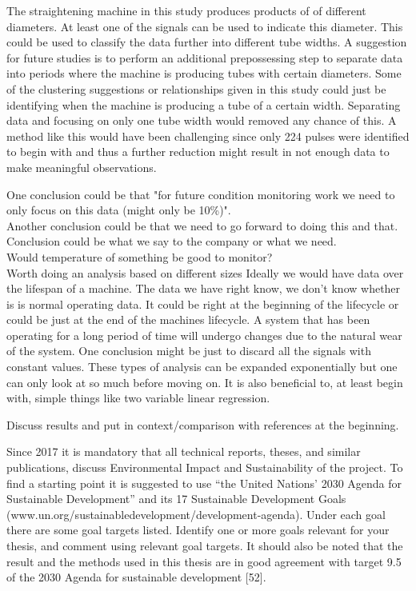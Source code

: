 \documentclass{article}
\begin{document}
The straightening machine in this study produces products of of different diameters. At least one of the signals can be used to indicate this diameter. This could be used to classify the data further into different tube widths. A suggestion for future studies is to perform an additional prepossessing step to separate data into periods where the machine is producing tubes with certain diameters. Some of the clustering suggestions or relationships given in this study could just be identifying when the machine is producing a tube of a certain width. Separating data and focusing on only one tube width would removed any chance of this. A method like this would have been challenging since only 224 pulses were identified to begin with and thus a further reduction might result in not enough data to make meaningful observations.

One conclusion could be that "for future condition monitoring work we need to only focus on this data (might only be 10\%)".\\
Another conclusion could be that we need to go forward to doing this and that.\\
Conclusion could be what we say to the company or what we need.\\
Would temperature of something be good to monitor?\\
Worth doing an analysis based on different sizes
Ideally we would have data over the lifespan of a machine. The data we have right know, we don't know whether is is normal operating data. It could be right at the beginning of the lifecycle or could be just at the end of the machines lifecycle. A system that has been operating for a long period of time will undergo changes due to the natural wear of the system.
One conclusion might be just to discard all the signals with constant values.
These types of analysis can be expanded exponentially but one can only look at so much before moving on. It is also beneficial to, at least begin with, simple things like two variable linear regression.

Discuss results and put in context/comparison with references at the beginning. 

Since 2017 it is mandatory that all technical reports, theses, and similar publications, discuss Environmental Impact and Sustainability of the project. To find a starting point it is suggested to use “the United Nations’ 2030 Agenda for Sustainable Development” and its 17 Sustainable Development Goals (www.un.org/sustainabledevelopment/development-agenda). Under each goal there are some goal targets listed. Identify one or more goals relevant for your thesis, and comment using relevant goal targets.
It should also be noted that the result and the methods used in this thesis are in good agreement with target 9.5 of the 2030 Agenda for sustainable development [52].
\end{document}
